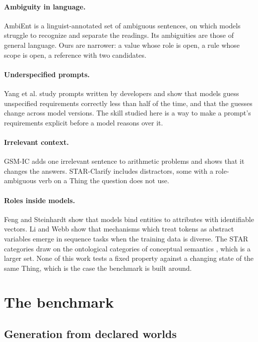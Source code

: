 \documentclass[11pt,a4paper]{article}
\begin{document}
\paragraph{Ambiguity in language.}
AmbiEnt \cite{liu2023afraid} is a linguist-annotated set of ambiguous
sentences, on which models struggle to recognize and separate the
readings. Its ambiguities are those of general language. Ours are narrower:
a value whose role is open, a rule whose scope is open, a reference with
two candidates.

\paragraph{Underspecified prompts.}
Yang et al. \cite{yang2026prompts} study prompts written by developers and
show that models guess unspecified requirements correctly less than half
of the time, and that the guesses change across model versions. The skill
studied here is a way to make a prompt's requirements explicit before a
model reasons over it.

\paragraph{Irrelevant context.}
GSM-IC \cite{shi2023distracted} adds one irrelevant sentence to arithmetic
problems and shows that it changes the answers. STAR-Clarify includes
distractors, some with a role-ambiguous verb on a Thing the question does
not use.

\paragraph{Roles inside models.}
Feng and Steinhardt \cite{feng2024binding} show that models bind entities
to attributes with identifiable vectors. Li and Webb
\cite{li2026symbolic} show that mechanisms which treat tokens as abstract
variables emerge in sequence tasks when the training data is diverse. The
STAR categories draw on the ontological categories of conceptual semantics
\cite{jackendoff1990semantic}, which is a larger set. None of this work
tests a fixed property against a changing state of the same Thing, which
is the case the benchmark is built around.

\section{The benchmark}
\label{sec:bench}

\subsection{Generation from declared worlds}
\end{document}
